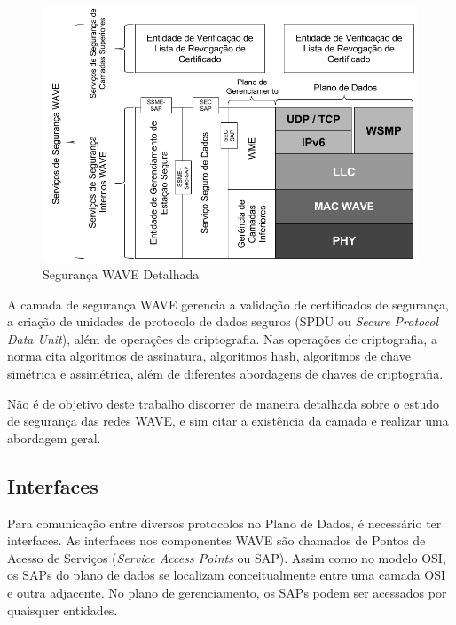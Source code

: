 \documentclass[
12pt,				%
openright,			%
oneside,			%
a4paper,			%
brazil,				%
]{abntex2}
\begin{document}
	\begin{figure} [H]
		\centering
		\includegraphics[scale=.5]{figuras/cap3/18SegurancaWAVEDetalhada}
		\caption{\label{fig_18}Segurança WAVE Detalhada}
	\end{figure}

	\par A camada de segurança WAVE gerencia a validação de certificados de segurança,  a criação de unidades de protocolo de dados seguros (SPDU ou \textit{Secure Protocol Data Unit}), além de operações de criptografia. Nas operações de criptografia, a norma cita algoritmos de assinatura, algoritmos hash, algoritmos de chave simétrica e assimétrica, além de diferentes abordagens de chaves de criptografia.

	\par Não é de objetivo deste trabalho discorrer de maneira detalhada sobre o estudo de segurança das redes WAVE, e sim citar a existência da camada e realizar uma abordagem geral.

	\subsection{Interfaces}
	\label{sec:Interfaces}

	\par Para comunicação entre diversos protocolos no Plano de Dados, é necessário ter interfaces. As interfaces nos componentes WAVE são chamados de Pontos de Acesso de Serviços (\textit{Service Access Points} ou SAP). Assim como no modelo OSI, os SAPs do plano de dados se localizam conceitualmente entre uma camada OSI e outra adjacente. No plano de gerenciamento, os SAPs podem ser acessados por quaisquer entidades.
\end{document}
